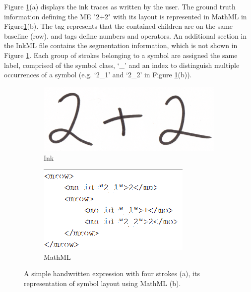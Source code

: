 \documentclass{article}
\begin{document}
Figure \ref{figInk}(a) displays the ink traces as written by the user. The ground truth information defining the ME "2+2" with its layout is represented in MathML in Figure\ref{figInk}(b). The  tag represents that the contained children are on the same baseline (row).  and  tags define numbers and operators. An additional section in the InkML file contains the segmentation information, which is not shown in Figure \ref{figInk}.
 Each group of strokes belonging to a symbol are assigned the same label, comprised of the symbol class, ‘\_’ and an index to distinguish multiple occurrences of a symbol (e.g. ‘2\_1’ and ‘2\_2’ in Figure \ref{figInk}(b)).
\begin{figure}
\begin{subfigure}{0.45\linewidth}
\includegraphics[width=\linewidth]{2plus2.png}
\caption{Ink}
\end{subfigure}
\begin{subfigure}{0.45\linewidth}
\includegraphics[width=\linewidth]{2p2mml.png}
\caption{MathML}
\end{subfigure}
\caption{ A simple handwritten expression with four strokes (a), its representation of symbol layout using MathML (b).
\label{figInk}}
\end{figure}
\end{document}
